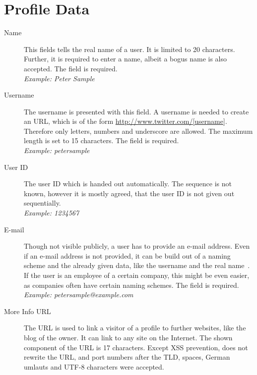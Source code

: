 \chapter{\Twitter{} Profile Data}
\label{chap:twitter_profile_data}

\begin{description}
\item[Name] This fields tells the real name of a user. It is limited to 20
            characters. Further, it is required to enter a name, albeit a bogus name is
            also accepted. The field is required.\\
            \textit{Example: Peter Sample}
\item[Username] The username is presented with this field. A username is needed
                to create an URL, which is of the form \url{http://www.twitter.com/[username]}.
                Therefore only letters, numbers and underscore are allowed. The maximum length
                is set to 15 characters. The field is required.\\
                \textit{Example: petersample}
\item[User ID] The user ID which is handed out automatically. The sequence is
               not known, however it is mostly agreed, that the user ID is not given out
               sequentially.\\
               \textit{Example: 1234567}
\item[E-mail] Though not visible publicly, a \Twitter{} user has to provide an
              e-mail address. Even if an e-mail address is not provided, it
              can be build out of a naming scheme and the already
              given data, like the username and the real name~\cite{brown2008}. If the user
              is an employee of a certain company, this might be even easier,
              as companies often have certain naming schemes. The field is required.\\
              \textit{Example: petersample@example.com}
\item[More Info URL] The URL is used to link a visitor of a profile to further
                     websites, like the blog of the owner. It can link to
                     any site on the Internet. The shown component of the
                     URL is 17 characters. Except XSS prevention,
                     \Twitter{} does not rewrite the URL, and port numbers
                     after the TLD, spaces, German umlauts and UTF-8 characters were
                     accepted.\\

\end{description}
